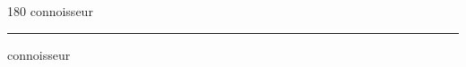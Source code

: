 
\begin{frame}
\begin{center}
\begin{turn}{180}
{\fontsize{2.5cm}{1em}\selectfont connoisseur}
\end{turn}
\vspace{1em}\par  
\hrule
\vspace{1em}\par  
{\fontsize{2.5cm}{1em}\selectfont connoisseur}
\end{center}
\end{frame}
